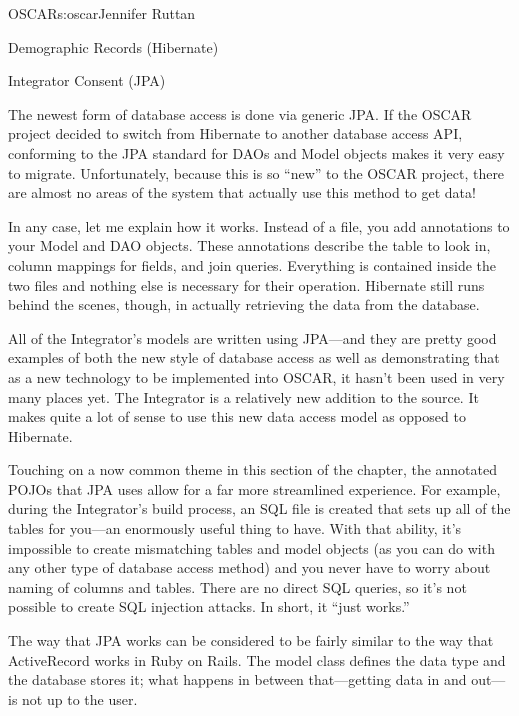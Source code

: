 \begin{aosachapter}{OSCAR}{s:oscar}{Jennifer Ruttan}
\begin{aosasect1}{Demographic Records (Hibernate)}
\end{aosasect1}

\begin{aosasect1}{Integrator Consent (JPA)}

The newest form of database access is done via generic JPA. If the
OSCAR project decided to switch from Hibernate to another database
access API, conforming to the JPA standard for DAOs and Model objects
makes it very easy to migrate. Unfortunately, because this is so
``new'' to the OSCAR project, there are almost no areas of the system
that actually use this method to get data!

In any case, let me explain how it works. Instead of a 
file, you add annotations to your Model and DAO objects. These
annotations describe the table to look in, column mappings for fields,
and join queries. Everything is contained inside the two files and
nothing else is necessary for their operation. Hibernate still runs
behind the scenes, though, in actually retrieving the data from the
database.

All of the Integrator's models are written using JPA---and they are
pretty good examples of both the new style of database access as well
as demonstrating that as a new technology to be implemented into
OSCAR, it hasn't been used in very many places yet. The Integrator is
a relatively new addition to the source. It makes quite a lot of sense
to use this new data access model as opposed to Hibernate.

Touching on a now common theme in this section of the chapter, the
annotated POJOs that JPA uses allow for a far more streamlined
experience. For example, during the Integrator's build process, an SQL
file is created that sets up all of the tables for you---an enormously
useful thing to have. With that ability, it's impossible to create
mismatching tables and model objects (as you can do with any other
type of database access method) and you never have to worry about
naming of columns and tables. There are no direct SQL queries, so it's
not possible to create SQL injection attacks. In short, it ``just
works.''

The way that JPA works can be considered to be fairly similar to the
way that ActiveRecord works in Ruby on Rails. The model class defines
the data type and the database stores it; what happens in between
that---getting data in and out---is not up to the user.

\end{aosasect1}


\end{aosachapter}
